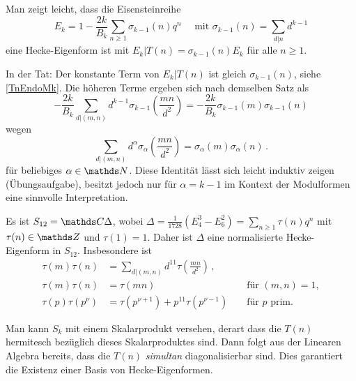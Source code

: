 \begin{beme-list}
\item Man zeigt \glqq{}leicht\grqq{}, dass die Eisensteinreihe \[
E_k = 1 - \frac{2k}{B_k} \sum_{n \geq 1} \sigma_{k-1} (n) q^n \quad \text{ mit } \sigma_{k-1} (n) = \sum_{d \vert n} d^{k-1}
\]
eine Hecke-Eigenform ist mit $E_k | T(n) = \sigma_{k-1}(n) E_k$ für alle $n \geq 1$.

In der Tat: Der konstante Term von $E_k | T(n)$ ist gleich $\sigma_{k-1}(n)$, siehe \ref{TnEndoMk}. Die höheren Terme ergeben sich nach demselben Satz als 
\[
- \frac{2k}{B_k} \sum_{d \vert (m,n)} d^{k-1} \sigma_{k-1} \left(\frac{mn}{d^2}\right) = - \frac{2k}{B_k} \sigma_{k-1}(m) \sigma_{k-1}(n)
\]
wegen
\[
\sum_{d \vert (m,n)} d^\alpha \sigma_\alpha \left(\frac{mn}{d^2}\right) = \sigma_\alpha(m) \sigma_\alpha(n)
\,.
\]
für beliebiges $\alpha \in \NN$. Diese Identität lässt sich leicht induktiv zeigen (Übungsaufgabe), besitzt jedoch nur für $\alpha = k - 1$ im Kontext der Modulformen eine sinnvolle Interpretation.
\item Es ist $S_{12} = \CC \Delta$, wobei $\Delta = \frac {1}{1728} (E_4^3 - E_6^2) = \sum_{n \geq 1} \tau(n) q^n$ mit $\tau (n) \in \ZZ$ und $\tau(1) = 1$. Daher ist $\Delta$ eine normalisierte Hecke-Eigenform in $S_{12}$. Insbesondere ist
\begin{align*}
\tau(m) \tau(n) &= \sum_{d \vert (m,n)} d^{11} \tau \left( \frac {mn}{d^2} \right)\,,\\
\tau(m) \tau(n) &= \tau(mn) &&\text{ für } (m,n) = 1,\\
\tau(p) \tau(p^\nu) &= \tau(p^{\nu+1}) + p^{11} \tau(p^{\nu-1}) &&\text{ für } p \text{ prim.}
\end{align*}
\item Man kann $S_k$ mit einem Skalarprodukt versehen, derart dass die $T(n)$ hermitesch bezüglich dieses Skalarproduktes sind. Dann folgt aus der Linearen Algebra bereits, dass die $T(n)$ \emph{simultan} diagonalisierbar sind. Dies garantiert die Existenz einer Basis von Hecke-Eigenformen.
\end{beme-list}
